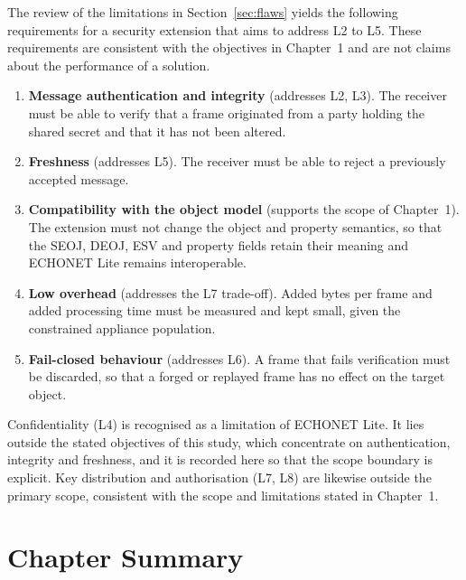 The review of the limitations in Section~\ref{sec:flaws} yields the following requirements for a security extension that aims to address L2 to L5. These requirements are consistent with the objectives in Chapter~1 and are not claims about the performance of a solution.

\begin{enumerate}
  \item \textbf{Message authentication and integrity} (addresses L2, L3). The receiver must be able to verify that a frame originated from a party holding the shared secret and that it has not been altered.
  \item \textbf{Freshness} (addresses L5). The receiver must be able to reject a previously accepted message.
  \item \textbf{Compatibility with the object model} (supports the scope of Chapter~1). The extension must not change the object and property semantics, so that the SEOJ, DEOJ, ESV and property fields retain their meaning and ECHONET Lite remains interoperable.
  \item \textbf{Low overhead} (addresses the L7 trade-off). Added bytes per frame and added processing time must be measured and kept small, given the constrained appliance population.
  \item \textbf{Fail-closed behaviour} (addresses L6). A frame that fails verification must be discarded, so that a forged or replayed frame has no effect on the target object.
\end{enumerate}

Confidentiality (L4) is recognised as a limitation of ECHONET Lite. It lies outside the stated objectives of this study, which concentrate on authentication, integrity and freshness, and it is recorded here so that the scope boundary is explicit. Key distribution and authorisation (L7, L8) are likewise outside the primary scope, consistent with the scope and limitations stated in Chapter~1.

\section{Chapter Summary}
\label{sec:ch2-summary}

